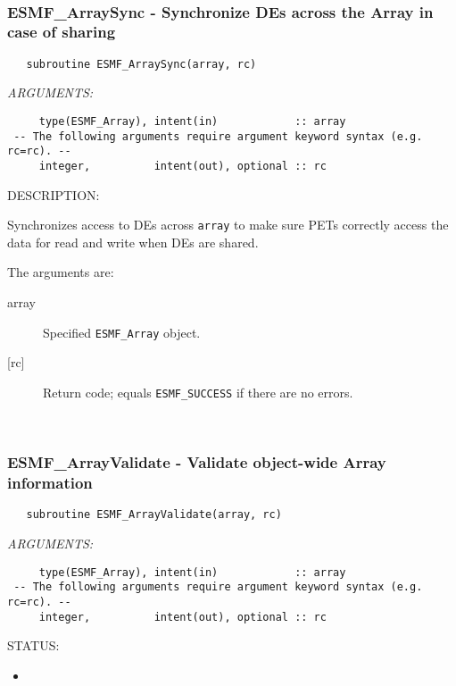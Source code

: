  
\mbox{}\hrulefill\ 
 
\subsubsection [ESMF\_ArraySync] {ESMF\_ArraySync - Synchronize DEs across the Array in case of sharing}


 
\begin{verbatim}   subroutine ESMF_ArraySync(array, rc)\end{verbatim}{\em ARGUMENTS:}
\begin{verbatim}     type(ESMF_Array), intent(in)            :: array
 -- The following arguments require argument keyword syntax (e.g. rc=rc). --
     integer,          intent(out), optional :: rc  \end{verbatim}
{\sf DESCRIPTION:\\ }


       Synchronizes access to DEs across {\tt array} to make sure PETs correctly
       access the data for read and write when DEs are shared. 
  
       The arguments are:
       \begin{description}
       \item[array] 
            Specified {\tt ESMF\_Array} object.
       \item[{[rc]}] 
            Return code; equals {\tt ESMF\_SUCCESS} if there are no errors.
       \end{description}
   
 
\mbox{}\hrulefill\ 
 
\subsubsection [ESMF\_ArrayValidate] {ESMF\_ArrayValidate - Validate object-wide Array information}


 
\begin{verbatim}   subroutine ESMF_ArrayValidate(array, rc)\end{verbatim}{\em ARGUMENTS:}
\begin{verbatim}     type(ESMF_Array), intent(in)            :: array
 -- The following arguments require argument keyword syntax (e.g. rc=rc). --
     integer,          intent(out), optional :: rc  \end{verbatim}
{\sf STATUS:}
   \begin{itemize}
   \item{}
   \end{itemize}
  
